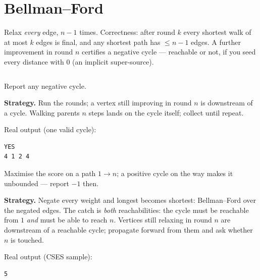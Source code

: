 \section{Bellman--Ford}\label{sec:bf}
Relax \emph{every} edge, $n{-}1$ times. Correctness: after round $k$
every shortest walk of at most $k$ edges is final, and any shortest
path has $\le n{-}1$ edges. A further improvement in round $n$
certifies a negative cycle --- reachable or not, if you seed every
distance with 0 (an implicit super-source).
\begin{lstlisting}[language=C++,caption={\texttt{bellmanford.h}:
rounds, parent pointers, one-cycle rebuild.},label={lst:bf}]
\end{lstlisting}

\begin{example}\label{ex:cycfind}
Report any negative cycle.
\par\smallskip
\textbf{Strategy.} Run the rounds; a vertex still improving in round
$n$ is downstream of a cycle. Walking parents $n$ steps lands on the
cycle itself; collect until repeat.
\par\smallskip
\begin{solution}

Real output (one valid cycle):
\begin{lstlisting}[numbers=none]
YES
4 1 2 4
\end{lstlisting}
\end{solution}
\end{example}
\begin{example}\label{ex:highscore}
Maximise the score on a path $1\to n$; a positive cycle on the way
makes it unbounded --- report $-1$ then.
\par\smallskip
\textbf{Strategy.} Negate every weight and longest becomes
shortest: Bellman--Ford over the negated edges. The catch is
\emph{both} reachabilities: the cycle must be reachable from $1$
\emph{and} must be able to reach $n$. Vertices still relaxing in
round $n$ are downstream of a reachable cycle; propagate forward
from them and ask whether $n$ is touched.
\par\smallskip
\begin{solution}

Real output (CSES sample):
\begin{lstlisting}[numbers=none]
5
\end{lstlisting}
\end{solution}
\end{example}

